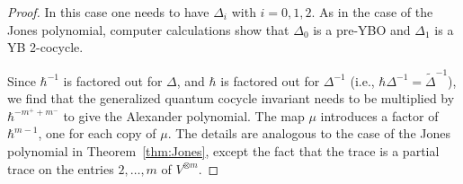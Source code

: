\documentclass[11pt,fleqn]{amsart} %
\begin{document}
\begin{proof}
			
			
			In this case one needs to have $\Delta_i$ with $i=0,1,2$. 
			As in the case of the Jones polynomial, computer calculations show that $\Delta_0$ is a pre-YBO and $\Delta_1$ is a YB 2-cocycle.
			
			Since $\hbar^{-1}$ is factored out for $\Delta$, and $\hbar$ is factored out for $\Delta^{-1}$  (i.e., $\hbar \Delta^{-1}= \tilde{\Delta}^{-1}$), we find that the generalized quantum cocycle invariant needs to be multiplied by $\hbar^{-m^++m^-}$ to give the Alexander polynomial. The map $\mu$ introduces a factor of $\hbar^{m-1}$, one for each copy of $\mu$. 
			The details are analogous to the case of the Jones polynomial in Theorem~\ref{thm:Jones}, except the fact that the trace is a partial trace on the entries $2, \ldots, m$ of $V^{\otimes m}$. 
\end{proof}
\end{document}
